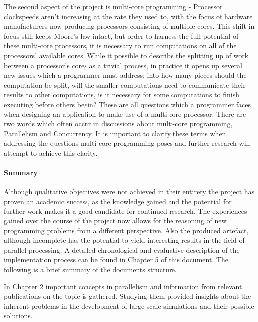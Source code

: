 \documentclass[main.tex]{subfiles}
\begin{document}
The second aspect of the project is multi-core programming - Processor clockspeeds aren't increasing at the rate they used to, with the focus of hardware manufacturers now producing processors consisting of multiple cores\cite{Sutter2005}. This shift in focus still keeps Moore's law intact, but order to harness the full potential of these multi-core processors, it is necessary to run computations on all of the processors' available cores. While it possible to describe the splitting up of work between a processor's cores as a trivial process, in practice it opens up several new issues which a programmer must address; into how many pieces should the computation be split, will the smaller computations need to communicate their results to other computations, is it necessary for some computations to finish executing before others begin? These are all questions which a programmer faces when designing an application to make use of a multi-core processor. There are two words which often occur in discussions about multi-core programming, Parallelism and Concurrency. It is important to clarify these terms when addressing the questions multi-core programming poses and further research will attempt to achieve this clarity.

\paragraph{Summary}
Although qualitative objectives were not achieved in their entirety the project has proven an academic success, as the knowledge gained and the potential for further work makes it a good candidate for continued research. The experiences gained over the course of the project now allows for the reasoning of new programming problems from a different perspective. Also the produced artefact, although incomplete has the potential to yield interesting results in the field of parallel processing. A detailed chronological and evaluative description of the implementation process can be found in Chapter 5 of this document. The following is a brief summary of the documents structure.

In Chapter 2 important concepts in parallelism and information from relevant publications on the topic is gathered. Studying them provided insights about the inherent problems in the development of large scale simulations and their possible solutions.
\end{document}
